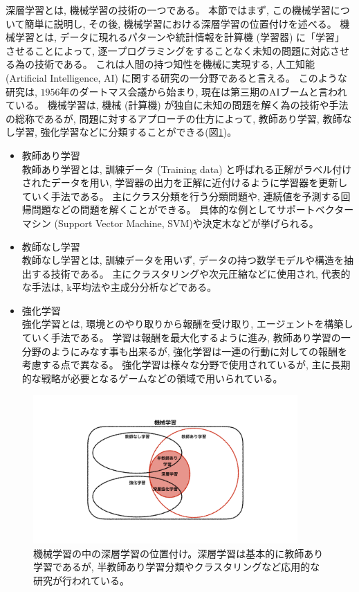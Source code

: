 深層学習とは, 機械学習の技術の一つである。
本節ではまず, この機械学習について簡単に説明し, その後, 機械学習における深層学習の位置付けを述べる。
\newpage
機械学習とは, データに現れるパターンや統計情報を計算機 (学習器) に「学習」させることによって, 逐一プログラミングをすることなく未知の問題に対応させる為の技術である。
これは人間の持つ知性を機械に実現する, 人工知能 (Artificial Intelligence, AI) に関する研究の一分野であると言える。
このような研究は, $1956$年のダートマス会議\cite{Dartmouth}から始まり, 現在は第三期のAIブームと言われている。
機械学習は, 機械 (計算機) が独自に未知の問題を解く為の技術や手法の総称であるが, 問題に対するアプローチの仕方によって, 教師あり学習, 教師なし学習, 強化学習などに分類することができる(図\ref{1MachineLearning})。

\begin{itemize}
  \item 教師あり学習\\
  教師あり学習とは, 訓練データ (Training data) と呼ばれる正解がラベル付けされたデータを用い, 学習器の出力を正解に近付けるように学習器を更新していく手法である。
  主にクラス分類を行う分類問題や, 連続値を予測する回帰問題などの問題を解くことができる。
  具体的な例としてサポートベクターマシン (Support Vector Machine, SVM\cite{PatternRecognitionUsingGeneralizedPortraitMethod,TrainingAlgorithmforOptimalMarginClassifiers})や決定木などが挙げられる。
  \item 教師なし学習\\
  教師なし学習とは, 訓練データを用いず, データの持つ数学モデルや構造を抽出する技術である。
  主にクラスタリングや次元圧縮などに使用され, 代表的な手法は, k平均法や主成分分析などである。
  \item 強化学習\\
  強化学習とは, 環境とのやり取りから報酬を受け取り, エージェントを構築していく手法である。
  学習は報酬を最大化するように進み, 教師あり学習の一分野のようにみなす事も出来るが, 強化学習は一連の行動に対しての報酬を考慮する点で異なる。
  強化学習は様々な分野で使用されているが, 主に長期的な戦略が必要となるゲームなどの領域で用いられている。
\end{itemize}

\begin{figure}[htbp]
 \centering
 \includegraphics[trim = 0 100 0 50, width=0.9\textwidth, clip]{Figure/2DeepLearning/1MachineLearning.png}
 \caption[機械学習の中の深層学習の位置付け]{機械学習の中の深層学習の位置付け。深層学習は基本的に教師あり学習であるが, 半教師あり学習分類やクラスタリングなど応用的な研究が行われている。}
 \label{1MachineLearning}
\end{figure}

